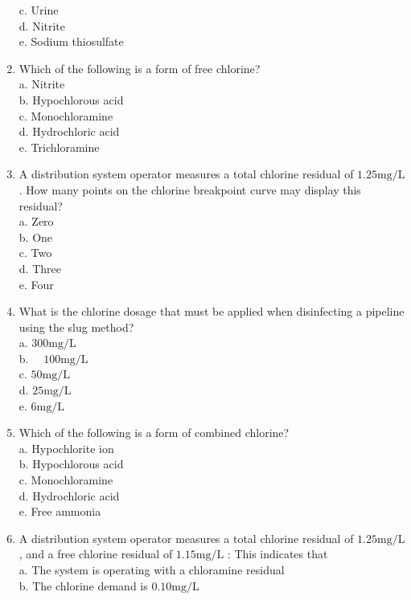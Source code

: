 \begin{enumerate}[1.]
c. Urine\\
d. Nitrite\\
e. Sodium thiosulfate\\
\item Which of the following is a form of free chlorine?\\
a. Nitrite\\
b. Hypochlorous acid\\
c. Monochloramine\\
d. Hydrochloric acid\\
e. Trichloramine\\
\item A distribution system operator measures a total chlorine residual of $1.25 \mathrm{mg} / \mathrm{L}$. How many points on the chlorine breakpoint curve may display this residual?\\
a. Zero\\
b. One\\
c. Two\\
d. Three\\
e. Four\\
\item What is the chlorine dosage that must be applied when disinfecting a pipeline using the slug method?\\
a. $300 \mathrm{mg} / \mathrm{L}$\\
b. $\quad 100 \mathrm{mg} / \mathrm{L}$\\
c. $50 \mathrm{mg} / \mathrm{L}$\\
d. $25 \mathrm{mg} / \mathrm{L}$\\
e. $6 \mathrm{mg} / \mathrm{L}$\\
\item Which of the following is a form of combined chlorine?\\
a. Hypochlorite ion\\
b. Hypochlorous acid\\
c. Monochloramine\\
d. Hydrochloric acid\\
e. Free ammonia\\
\item A distribution system operator measures a total chlorine residual of $1.25 \mathrm{mg} / \mathrm{L}$, and a free chlorine residual of $1.15 \mathrm{mg} / \mathrm{L}$ : This indicates that\\
a. The system is operating with a chloramine residual\\
b. The chlorine demand is $0.10 \mathrm{mg} / \mathrm{L}$\\

\end{enumerate}
